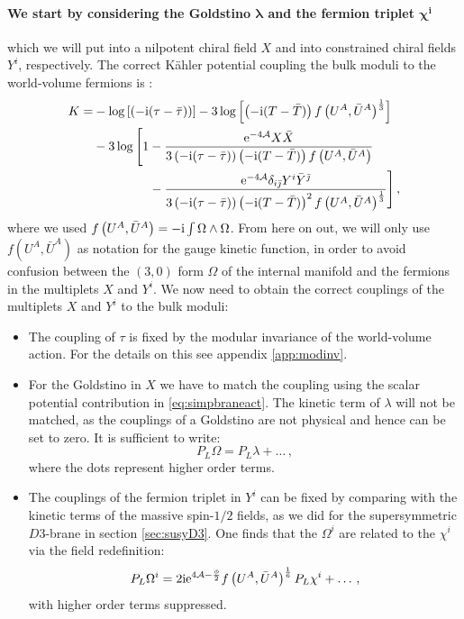 \documentclass[a4paper,12pt]{report}
\newcommand{\be}{\begin{equation}}
\newcommand{\ee}{\end{equation}}
\newcommand{\bea}{\begin{equation}\begin{aligned}}
\newcommand{\eea}{\end{aligned}\end{equation}}
\def\rmi{{\rm i}}
\def\rme{{\rm e}}
\def\jb{{\bar \jmath}}
\begin{document}
\paragraph{We start by considering the Goldstino $\mathbf{\lambda}$ and the fermion triplet $\mathbf{\chi^i}$} which we will put into a nilpotent chiral field $X$ and into constrained chiral fields $Y^i$, respectively. The correct Kähler potential coupling the bulk moduli to the world-volume fermions is \cite{GarciadelMoral:2017vnz}:
\bea 
K = &- \log\left[\left(-\rmi(\tau-\bar{\tau})\right)\right] - 3 \log\left[\left(-\rmi(T-\bar{T})\right)f\left(U^A,\bar{U}^A\right)^{\frac{1}{3}}\right]\\
&- 3\log \Bigg[ 1- \frac{\rme^{-4\mathcal{A}} X\bar{X}}{3\left(-\rmi (\tau-\bar{\tau})\right)\left(-\rmi(T-\bar{T})\right)f\left(U^A,\bar{U}^A\right)}\\
&\qquad \qquad \;\,  - \frac{\rme^{-4\mathcal{A}}\delta_{i\jb}Y^i \bar{Y}^\jb}{3\left(-\rmi (\tau-\bar{\tau})\right)\left(-\rmi(T-\bar{T})\right)^2 f\left(U^A,\bar{U}^A\right)^{\frac{1}{3}}}\Bigg]\,,
\eea
where we used $f\left(U^A,\bar{U}^A\right) = -\rmi \int \Omega \wedge \Omega$. From here on out, we will only use $f\left(U^A,\bar{U}^A\right)$ as notation for the gauge kinetic function, in order to avoid confusion between the $(3,0)$ form $\Omega$ of the internal manifold and the fermions in the multiplets $X$ and $Y^i$. We now need to obtain the correct couplings of the multiplets $X$ and $Y^i$ to the bulk moduli:
\begin{itemize}
\item The coupling of $\tau$ is fixed by the modular invariance of the world-volume action. For the details on this see appendix \ref{app:modinv}.
\item For the Goldstino in $X$ we have to match the coupling using the scalar potential contribution in \eqref{eq:simpbraneact}. The kinetic term of $\lambda$ will not be matched, as the couplings of a Goldstino are not physical and hence can be set to zero. It is sufficient to write:
\be 
P_L \Omega = P_L \lambda + \ldots\,,
\ee
where the dots represent higher order terms.
\item The couplings of the fermion triplet in $Y^i$ can be fixed by comparing with the kinetic terms of the massive spin-$1/2$ fields, as we did for the supersymmetric $D3$-brane in section \ref{sec:susyD3}. One finds that the $\Omega^i$ are related to the $\chi^i$ via the field redefinition:
\be 
P_L \Omega^i = 2 \rmi \rme^{4\mathcal{A}-\frac{\phi}{2}} f\left(U^A ,\bar{U}^A\right)^{\frac{1}{6}} P_L \chi^i + \ldots\,,
\ee
with higher order terms suppressed.
\end{itemize}
\end{document}
